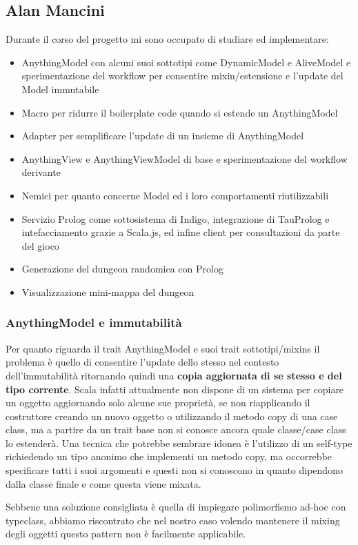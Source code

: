 \subsection{Alan Mancini}
Durante il corso del progetto mi sono occupato di studiare ed implementare:
\begin{itemize}
    \item AnythingModel con alcuni suoi sottotipi come DynamicModel e AliveModel e sperimentazione del workflow per consentire mixin/estensione e l'update del Model immutabile 
    \item Macro per ridurre il boilerplate code quando si estende un AnythingModel
    \item Adapter per semplificare l'update di un insieme di AnythingModel
    \item AnythingView e AnythingViewModel di base e sperimentazione del workflow derivante
    \item Nemici per quanto concerne Model ed i loro comportamenti riutilizzabili
    \item Servizio Prolog come sottosistema di Indigo, integrazione di TauProlog e intefacciamento grazie a Scala.js, ed infine client per consultazioni da parte del gioco
    \item Generazione del dungeon randomica con Prolog
    \item Visualizzazione mini-mappa del dungeon
\end{itemize}
\subsubsection{AnythingModel e immutabilità}
Per quanto riguarda il trait AnythingModel e suoi trait sottotipi/mixins il problema è quello di consentire l'update dello stesso nel contesto dell'immutabilità ritornando quindi una \textbf{copia aggiornata di se stesso e del tipo corrente}. 
Scala infatti attualmente non dispone di un sistema per copiare un oggetto aggiornando solo alcune sue proprietà, se non riapplicando il costruttore creando un nuovo oggetto o utilizzando il metodo copy di una case class, ma a partire da un trait base non si conosce ancora quale classe/case class lo estenderà.
Una tecnica che potrebbe sembrare idonea è l'utilizzo di un self-type richiedendo un tipo anonimo che implementi un metodo copy, ma occorrebbe specificare tutti i suoi argomenti e questi non si conoscono in quanto dipendono dalla classe finale e come questa viene mixata.

Sebbene una soluzione consigliata è quella di impiegare polimorfismo ad-hoc con typeclass, abbiamo riscontrato che nel nostro caso volendo mantenere il mixing degli oggetti questo pattern non è facilmente applicabile.

